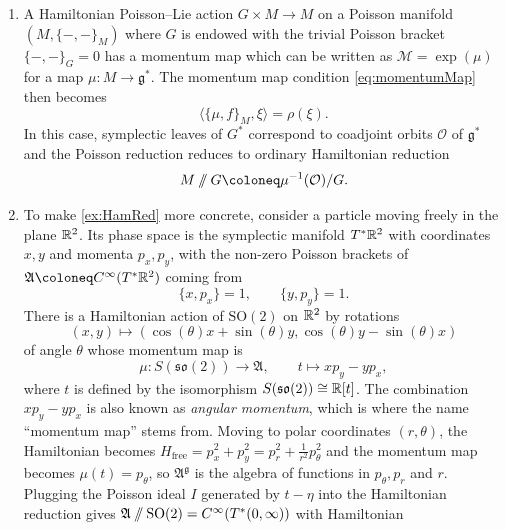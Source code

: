 \begin{example}\label{ex:PoissonRed}
	\begin{enumerate}[label=(\roman*)]
		\item \label{ex:HamRed}A Hamiltonian Poisson--Lie action $G \times M \to M$ on a Poisson manifold $(M,\{-,-\}_M)$ where $G$ is endowed with the trivial Poisson bracket $\{-,-\}_G = 0$ has a momentum map which can be written as $\mathcal{M} = \exp(\mu)$ for a map $\mu\colon M \to \mathfrak{g}^*$. The momentum map condition \eqref{eq:momentumMap} then becomes
		\begin{equation}
			\langle \{\mu,f\}_M, \xi \rangle = \rho(\xi).
		\end{equation}
		In this case, symplectic leaves of $G^*$ correspond to coadjoint orbits $\mathcal{O}$ of $\mathfrak{g}^*$ and the Poisson reduction reduces to ordinary Hamiltonian reduction
		\begin{equation}
			M \hred G \coloneq \mu^{-1}(\mathcal{O}) / G.
		\end{equation}
		\item \label{ex:HamRedCM}To make \ref{ex:HamRed} more concrete, consider a particle moving freely in the plane $\mathbb{R}^2$. Its phase space is the symplectic manifold $T^* \mathbb{R}^2$ with coordinates $x,y$ and momenta $p_x,p_y$, with the non-zero Poisson brackets of $\mathfrak{A} \coloneq C^\infty(T^* \R^2)$ coming from
	\begin{equation}
		\{ x,p_x \} = 1, \qquad \{ y,p_y \} = 1.
	\end{equation}
	There is a Hamiltonian action of $\mathrm{SO}(2)$ on $\mathbb{R}^2$ by rotations
	\begin{equation}
		(x,y) \mapsto (\cos(\theta) x + \sin(\theta) y,\cos(\theta) y - \sin(\theta) x)
	\end{equation}
	of angle $\theta$ whose momentum map is
	\begin{equation}
		\mu\colon S(\mathfrak{so}(2)) \to \mathfrak{A}, \qquad t \mapsto x p_y - y p_x,
	\end{equation}		
	where $t$ is defined by the isomorphism $S(\mathfrak{so}(2)) \cong \mathbb{R}[t]$. The combination $x p_y - y p_x$ is also known as \emph{angular momentum}, which is where the name ``momentum map'' stems from. Moving to polar coordinates $(r,\theta)$, the Hamiltonian becomes $H_\text{free} = p_x^2 + p_y^2 = p_r^2 + \frac{1}{r^2} p_\theta^2$ and the momentum map becomes $\mu(t) = p_\theta$, so $\mathfrak{A}^\mathfrak{g}$ is the algebra of functions in $p_\theta,p_r$ and $r$. Plugging the Poisson ideal $I$ generated by $t - \eta$ into the Hamiltonian reduction gives $\mathfrak{A} \mathbin{/\!\!/} \mathrm{SO}(2) = C^\infty(T^* (0,\infty))$ with Hamiltonian

\end{enumerate}
\end{example}
